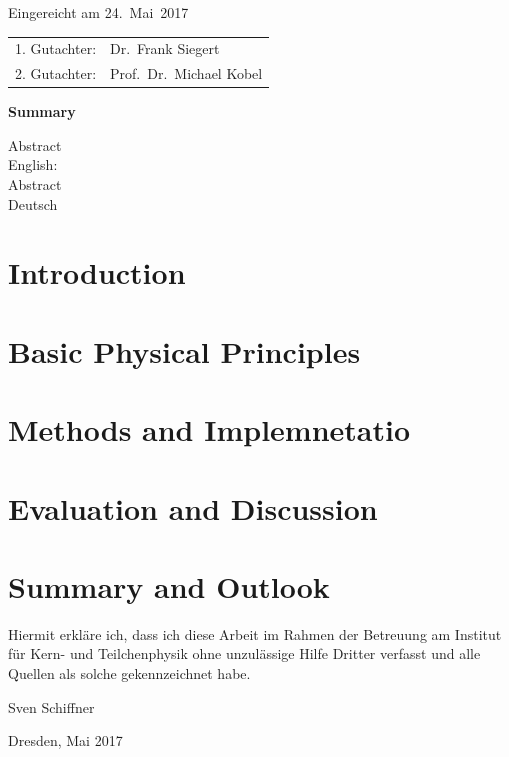 \thispagestyle{empty}\vspace*{48em}

Eingereicht am 24.~Mai~2017\vspace{1.5em}
\par{\large\begin{tabular}{ll}
 1. Gutachter: & Dr.~Frank Siegert \\
 2. Gutachter: & Prof.~Dr.~Michael Kobel \\
\end{tabular}}


\newpage
\begin{center}\large\bfseries Summary\end{center}


Abstract \\ 
English: \\

\vspace{20em}
Abstract \\ 
Deutsch \\
 
 

\tableofcontents




\chapter{Introduction}

\chapter{Basic Physical Principles}


\chapter{Methods and Implemnetatio}

\chapter{Evaluation and Discussion}


\chapter{Summary and Outlook}


\printbibliography


\clearpage
\thispagestyle{empty}
\vspace*{1.5em}

Hiermit erkläre ich, dass ich diese Arbeit im Rahmen der Betreuung am Institut
für Kern- und Teilchenphysik ohne unzulässige Hilfe Dritter verfasst und alle Quellen als solche gekennzeichnet habe.

\vspace*{45em}

Sven Schiffner \par
Dresden, Mai 2017


